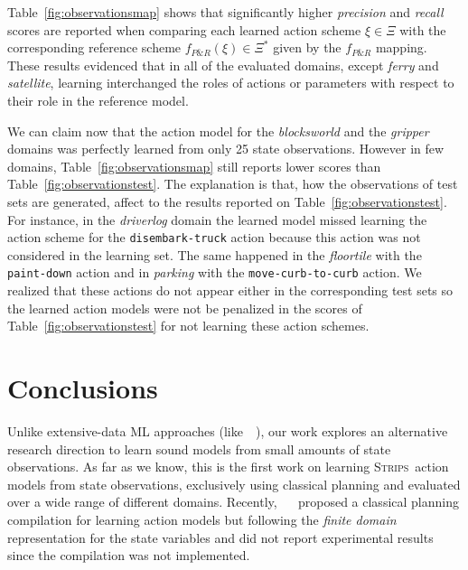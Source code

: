 \documentclass{article}
\newcommand{\strips}{\textsc{Strips}}     %
\begin{document}
Table~\ref{fig:observationsmap} shows that significantly higher {\em precision} and {\em recall} scores are reported when comparing each learned action scheme $\xi\in\Xi$ with the corresponding reference scheme $f_{P\&R}(\xi)\in \Xi^*$ given by the $f_{P\&R}$ mapping. These results evidenced that in all of the evaluated domains, except {\em ferry} and {\em satellite}, learning interchanged the roles of actions or parameters with respect to their role in the reference model.

We can claim now that the action model for the {\em blocksworld} and the {\em gripper} domains was perfectly learned from only 25 state observations. However in few domains, Table~\ref{fig:observationsmap} still reports lower scores than Table~\ref{fig:observationstest}. The explanation is that, how the observations of test sets are generated, affect to the results reported on Table~\ref{fig:observationstest}. For instance, in the {\em driverlog} domain the learned model missed learning the action scheme for the {\tt disembark-truck} action because this action was not considered in the learning set. The same happened in the {\em floortile} with the {\tt paint-down} action and in {\em parking} with the {\tt move-curb-to-curb} action. We realized that these actions do not appear either in the corresponding test sets so the learned action models were not be penalized in the scores of Table~\ref{fig:observationstest} for not learning these action schemes.  %





\section{Conclusions}
Unlike extensive-data ML approaches (like~\citeauthor{asai2017classical}~\citeyear{asai2017classical}), our work explores an alternative research direction to learn sound models from small amounts of state observations. As far as we know, this is the first work on learning \strips\ action models from state observations, exclusively using classical planning and evaluated over a wide range of different domains. Recently, ~\citeauthor{stern2017efficient}~\citeyear{stern2017efficient} proposed a classical planning compilation for learning action models but following the {\em finite domain} representation for the state variables and did not report experimental results since the compilation was not implemented.
\end{document}
